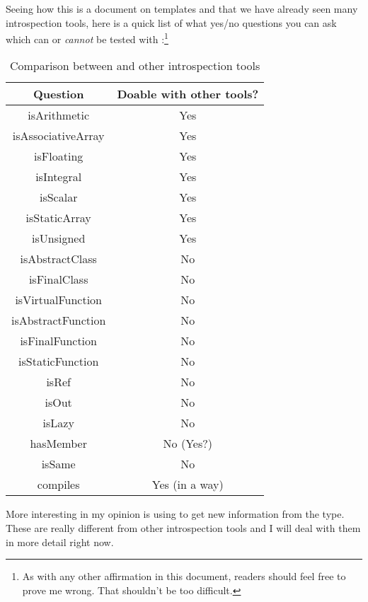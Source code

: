 Seeing how this is a document on templates and that we have already seen many introspection tools, here is a quick list of what yes/no questions you can ask which can or \emph{cannot} be tested with :\footnote{As with any other affirmation in this document, readers should feel free to prove me wrong. That shouldn't be too difficult.}

\begin{table}[htb]
\centering
\begin{tabular}[c]{|c|c|}
\hline
Question & Doable with other tools? \\
\hline
\hline
isArithmetic & Yes \\
isAssociativeArray & Yes \\
isFloating & Yes \\
isIntegral & Yes \\
isScalar & Yes \\
isStaticArray & Yes \\
isUnsigned & Yes \\
\hline
\hline
isAbstractClass & No \\
isFinalClass & No \\
isVirtualFunction & No \\
isAbstractFunction & No \\
isFinalFunction & No \\
isStaticFunction & No \\
\hline
\hline
isRef & No \\
isOut & No \\
isLazy & No \\
\hline
\hline
hasMember & No (Yes?) \\
isSame & No \\
compiles & Yes (in a way) \\
\hline
\end{tabular}
\caption{Comparison between  and other introspection tools}
\label{table:traits}
\end{table}


More interesting in my opinion is using  to get new information from the type. These are really different from other introspection tools and I will deal with them in more detail right now.

